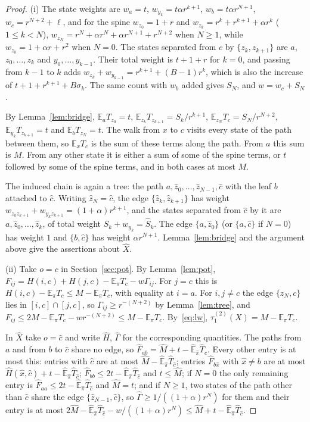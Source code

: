 \documentclass[11pt]{amsart}
\theoremstyle{definition}
\newcommand{\E}{\mathbb{E}}
\newcommand{\tmix}{\tau_1^{(2)}}
\newcommand{\hE}{\widehat{\E}}
\newcommand{\hpi}{\widehat{\pi}}
\newcommand{\hX}{\widehat{X}}
\newcommand{\hM}{\widehat{M}}
\newcommand{\hS}{\widehat{S}}
\newcommand{\hF}{\widehat{F}}
\begin{document}
\begin{proof}
(i) The state weights are $w_a=t$, $w_{y_k}=t\alpha r^{k+1}$, $w_b=t\alpha r^{N+1}$, $w_c=r^{N+2}+\ell$, and for the
spine $w_{z_0}=1+r$ and $w_{z_k}=r^k+r^{k+1}+\alpha r^k$ ($1\le k<N$), $w_{z_N}=r^N+\alpha r^N+\alpha r^{N+1}+r^{N+2}$
when $N\ge1$, while $w_{z_0}=1+\alpha r+r^2$ when $N=0$. The states separated from $c$ by $\{z_k,z_{k+1}\}$ are $a$,
$z_0,\dots,z_k$ and $y_0,\dots,y_{k-1}$. Their total weight is $t+1+r$ for $k=0$, and passing from $k-1$ to $k$ adds
$w_{z_k}+w_{y_{k-1}}=r^{k+1}+(B-1)r^k$, which is also the increase of $t+1+r^{k+1}+B\sigma_k$. The same count with
$w_b$ added gives $S_N$, and $w=w_c+S_N$.

By Lemma~\ref{lem:bridge}, $\E_aT_{z_0}=t$, $\E_{z_k}T_{z_{k+1}}=S_k/r^{k+1}$, $\E_{z_N}T_c=S_N/r^{N+2}$,
$\E_{y_k}T_{z_{k+1}}=t$ and $\E_bT_{z_N}=t$. The walk from $x$ to $c$ visits every state of the path between them, so
$\E_xT_c$ is the sum of these terms along the path. From $a$ this sum is $M$. From any other state it is either a sum
of some of the spine terms, or $t$ followed by some of the spine terms, and in both cases at most $M$.

The induced chain is again a tree: the path $a,\hat z_0,\dots,\hat z_{N-1},\hat c$ with the leaf $b$ attached to
$\hat c$. Writing $\hat z_N=\hat c$, the edge $\{\hat z_k,\hat z_{k+1}\}$ has weight
$w_{z_kz_{k+1}}+w_{y_kz_{k+1}}=(1+\alpha)r^{k+1}$, and the states separated from $\hat c$ by it are $a,\hat z_0,\dots,
\hat z_k$, of total weight $S_k+w_{y_k}=\hS_k$. The edge $\{a,\hat z_0\}$ (or $\{a,\hat c\}$ if $N=0$) has weight $1$
and $\{b,\hat c\}$ has weight $\alpha r^{N+1}$. Lemma~\ref{lem:bridge} and the argument above give the assertions
about $\hX$.

(ii) Take $o=c$ in Section~\ref{sec:pot}. By Lemma~\ref{lem:pot}, $F_{ij}=H(i,c)+H(j,c)-\E_\pi T_c-w\Gamma_{ij}$. For
$j=c$ this is $H(i,c)-\E_\pi T_c\le M-\E_\pi T_c$, with equality at $i=a$. For $i,j\ne c$ the edge $\{z_N,c\}$ lies in
$[i,c]\cap[j,c]$, so $\Gamma_{ij}\ge r^{-(N+2)}$ by Lemma~\ref{lem:tree}, and
$F_{ij}\le2M-\E_\pi T_c-wr^{-(N+2)}\le M-\E_\pi T_c$. By~\eqref{eq:lw}, $\tmix(X)=M-\E_\pi T_c$.

In $\hX$ take $o=\hat c$ and write $\widehat H$, $\widehat\Gamma$ for the corresponding quantities. The paths from $a$
and from $b$ to $\hat c$ share no edge, so $\hF_{ab}=\hM+t-\hE_{\hpi}\widehat T_{\hat c}$. Every other entry is at most
this: entries with $\hat c$ are at most $\hM-\hE_{\hpi}\widehat T_{\hat c}$; entries $\hF_{b\hat x}$ with $\hat x\ne
b$ are at most $\widehat H(\hat x,\hat c)+t-\hE_{\hpi}\widehat T_{\hat c}$; $\hF_{bb}\le2t-\hE_{\hpi}\widehat
T_{\hat c}$ and $t\le\hM$; if $N=0$ the only remaining entry is $\hF_{aa}\le2t-\hE_{\hpi}\widehat T_{\hat c}$ and
$\hM=t$; and if $N\ge1$, two states of the path other than $\hat c$ share the edge $\{\hat z_{N-1},\hat c\}$, so
$\widehat\Gamma\ge1/((1+\alpha)r^N)$ for them and their entry is at most
$2\hM-\hE_{\hpi}\widehat T_{\hat c}-w/((1+\alpha)r^N)\le\hM+t-\hE_{\hpi}\widehat T_{\hat c}$.


\end{proof}
\end{document}
